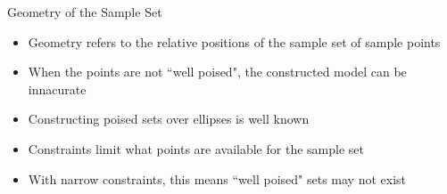 \documentclass{beamer}
\begin{document}
\begin{frame}{Geometry of the Sample Set}
    \begin{itemize}
        \item<1, 2, 3> Geometry refers to the relative positions of the sample set of sample points
        \item<1, 2, 3> When the points are not ``well poised", the constructed model can be innacurate \\
        \item<3> Constructing poised sets over ellipses is well known
        \item<3> Constraints limit what points are available for the sample set
        \item<3> With narrow constraints, this means ``well poised" sets may not exist
    \end{itemize}
\end{frame}


\end{document}
